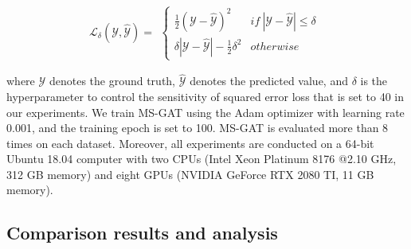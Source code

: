 \begin{equation}
    \label{eqn:huber_loss}
    \mathcal{L}_{\delta}(\mathcal{Y}, \hat{\mathcal{Y}}) =
    \begin{aligned}
        \begin{cases}
            \frac{1}{2} \left ( \mathcal{Y} - \hat{\mathcal{Y}} \right ) ^2                 & if \ \left | \mathcal{Y} - \hat{\mathcal{Y}} \right | \leq \delta \\
            \delta \left | \mathcal{Y} - \hat{\mathcal{Y}} \right | - \frac{1}{2} \delta ^2 & otherwise
        \end{cases}
    \end{aligned}
\end{equation}

where $\mathcal{Y}$ denotes the ground truth, $\hat{\mathcal{Y}}$ denotes the predicted value, and $\delta$ is the hyperparameter to control the sensitivity of squared error loss that is set to 40 in our experiments.
We train MS-GAT using the Adam optimizer with learning rate 0.001, and the training epoch is set to 100. MS-GAT is evaluated more than 8 times on each dataset. Moreover, all experiments are conducted on a 64-bit Ubuntu 18.04 computer with two CPUs (Intel Xeon Platinum 8176 @2.10 GHz, 312 GB memory) and eight GPUs (NVIDIA GeForce RTX 2080 TI, 11 GB memory).

\subsection{Comparison results and analysis}

